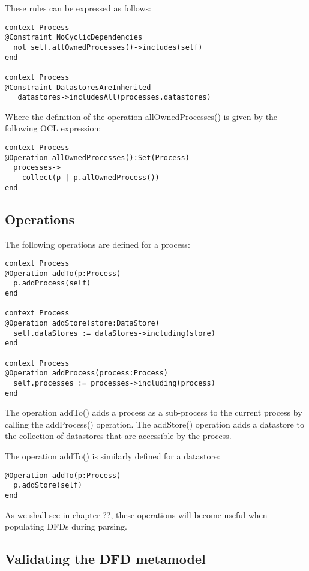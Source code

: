 \noindent These rules can be expressed as follows:

\small
\begin{verbatim}
context Process
@Constraint NoCyclicDependencies
  not self.allOwnedProcesses()->includes(self)
end  

context Process
@Constraint DatastoresAreInherited
   datastores->includesAll(processes.datastores)
\end{verbatim}
\normalsize

\noindent Where the definition of the operation allOwnedProcesses() is given by the following OCL expression:

\small
\begin{verbatim}
context Process
@Operation allOwnedProcesses():Set(Process)
  processes->
    collect(p | p.allOwnedProcess())
end  
\end{verbatim}
\normalsize

\subsection{Operations}

The following operations are defined for a process:

\small
\begin{verbatim}
context Process
@Operation addTo(p:Process)
  p.addProcess(self)
end

context Process
@Operation addStore(store:DataStore)
  self.dataStores := dataStores->including(store)
end

context Process
@Operation addProcess(process:Process)
  self.processes := processes->including(process)
end 
\end{verbatim}
\normalsize

The operation addTo() adds a process as a sub-process to the current process by calling the addProcess() operation. The addStore() operation adds a datastore to the collection of datastores that are accessible by the process.

The operation addTo() is similarly defined for a datastore:

\small
\begin{verbatim}
@Operation addTo(p:Process)
  p.addStore(self)
end
\end{verbatim}
\normalsize

As we shall see in chapter ??, these operations will become useful when populating DFDs during parsing.

\subsection{Validating the DFD metamodel}

